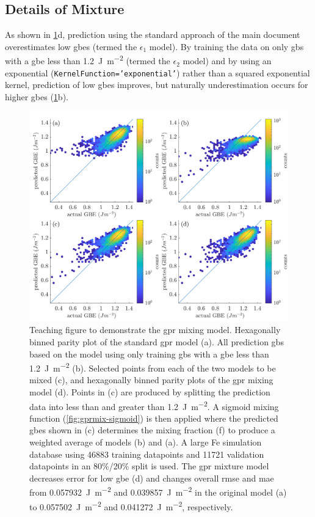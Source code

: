 \documentclass[preprint,12pt]{elsarticle}
\newcommand{\thr}{\SI{1.2}{\joule\per\square\meter}}
\begin{document}
\subsection{Details of  Mixture}
\label{sec:supp:kim-interp:method}
As shown in \cref{fig:kim-interp-teach}d, prediction using the standard approach of the main document overestimates low \glspl{gbe} (termed the $\epsilon_1$ model). By training the data on only \glspl{gb} with a \gls{gbe} less than \thr{} (termed the $\epsilon_2$ model) and by using an exponential (\texttt{KernelFunction='exponential'}) rather than a squared exponential kernel, prediction of low \glspl{gbe} improves, but naturally underestimation occurs for higher \glspl{gbe} (\cref{fig:kim-interp-teach}b).

\begin{figure}
    \centering
    \includegraphics{kim-interp-teach.png}
    \caption{Teaching figure to demonstrate the \gls{gpr} mixing model. Hexagonally binned parity plot of the standard \gls{gpr} model (a). All prediction \glspl{gb} based on the model using only training \glspl{gb} with a \gls{gbe} less than \thr{} (b). Selected points from each of the two models to be mixed (c), and hexagonally binned parity plots of the \gls{gpr} mixing model (d). Points in (c) are produced by splitting the prediction data into less than and greater than \thr{}. A sigmoid mixing function (\cref{fig:gprmix-sigmoid}) is then applied where the predicted \glspl{gbe} shown in (c) determines the mixing fraction (f) to produce a weighted average of models (b) and (a). A large Fe simulation database \cite{kimPhasefieldModeling3D2014} using \num{46883} training datapoints and \num{11721} validation datapoints in an 80\%/20\% split is used. The \gls{gpr} mixture model decreases error for low \gls{gbe} (d) and changes overall \gls{rmse} and \gls{mae} from \SI{0.057932}{\J\per\square\meter} and \SI{0.039857}{\J\per\square\meter} in the original model (a) to \SI{0.057502}{\J\per\square\meter} and \SI{0.041272}{\J\per\square\meter}, respectively.}
    \label{fig:kim-interp-teach}
\end{figure}
\end{document}
